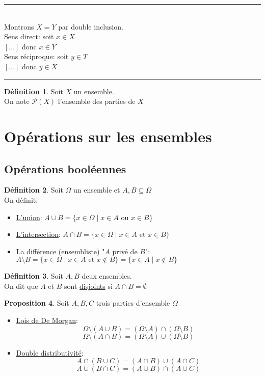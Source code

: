 \documentclass[10pt,a4paper]{article}
\theoremstyle{definition}
\newtheorem{proposition}{Proposition}[section]
\newtheorem{definition}[proposition]{Définition}
\begin{document}
\noindent \rule{20em}{0.5pt} \\
\indent Montrons $X = Y$ par double inclusion. \\
\indent Sens direct: soit $x \in X$ \\
\indent $[...]$ donc $x \in Y$ \\
\indent Sens réciproque: soit $y \in T$ \\
\indent $[...]$ donc $y \in X$ \\
\rule{20em}{0.5pt}
\begin{definition}
Soit $X$ un ensemble. \\
On note $\mathcal{P}(X)$ l'ensemble des parties de $X$
\end{definition}

\section{Opérations sur les ensembles}
\subsection{Opérations booléennes}
\begin{definition}
Soit $\Omega$ un ensemble et $A, B \subseteq \Omega$ \\
On définit:
\begin{itemize}
\item \uline{L'union}: $A \cup B = \{ x \in \Omega \mid x \in A \text{ ou } x \in B \}$
\item \uline{L'intersection}: $A \cap B = \{ x \in \Omega \mid x \in A \text{ et } x \in B \}$
\item La \uline{différence} (ensembliste) "$A$ privé de $B$": $A \setminus B = \{ x \in \Omega \mid x \in A \text{ et } x \not\in B \} = \{ x \in A \mid x \not\in B \}$
\end{itemize}
\end{definition}
\begin{definition}
Soit $A, B$ deux ensembles. \\
On dit que $A$ et $B$ sont \uline{disjoints} si $A \cap B = \emptyset$
\end{definition}
\begin{proposition}
Soit $A, B, C$ trois parties d'ensemble $\Omega$
\begin{itemize}
\item \uline{Lois de De Morgan}:
\[ \Omega \setminus (A \cup B) = (\Omega \setminus A) \cap (\Omega \setminus B) \]
\[ \Omega \setminus (A \cap B) = (\Omega \setminus A) \cup (\Omega \setminus B) \]
\item \uline{Double distributivité}:
\[ A \cap (B \cup C) = (A \cap B) \cup (A \cap C) \]
\[ A \cup (B \cap C) = (A \cup B) \cap (A \cup C) \]
\end{itemize}
\end{proposition}
\end{document}
